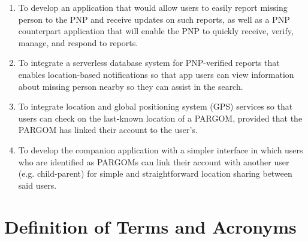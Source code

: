 \begin{enumerate}
   \item To develop an application that would allow users to easily report missing person to the PNP and receive updates on such reports, as well as a PNP counterpart application that will enable the PNP to quickly receive, verify, manage, and respond to reports.
   \item To integrate a serverless database system for PNP-verified reports that enables location-based notifications so that app users can view information about missing person nearby so they can assist in the search.
   \item To integrate location and global positioning system (GPS) services so that users can check on the last-known location of a PARGOM, provided that the PARGOM has linked their account to the user’s.
   \item To develop the companion application with a simpler interface in which users who are identified as PARGOMs can link their account with another user (e.g. child-parent) for simple and straightforward location sharing between said users.
\end{enumerate}

\section{ Definition of Terms and Acronyms}

